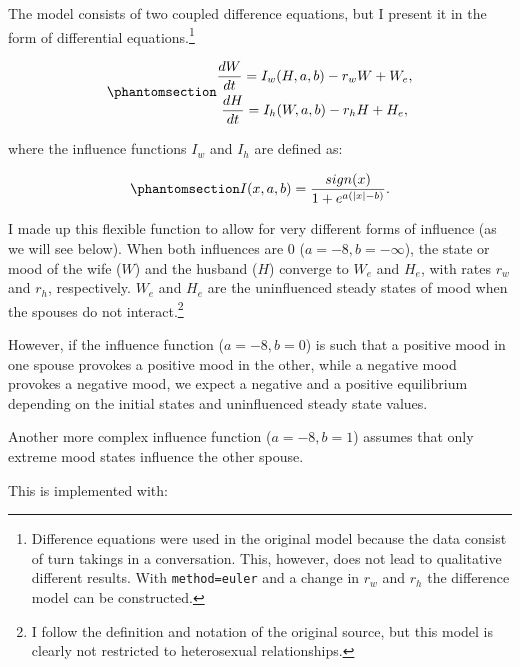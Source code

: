 \documentclass[
  a4paper,
  DIV=11,
  numbers=noendperiod,
  oneside]{scrreprt}
\begin{document}
The model consists of two coupled difference equations, but I present it
in the form of differential equations.\footnote{Difference equations
  were used in the original model because the data consist of turn
  takings in a conversation. This, however, does not lead to qualitative
  different results. With
  \texttt{method=\textquotesingle{}euler\textquotesingle{}} and a change
  in \(r_{w}\) and \(r_{h}\) the difference model can be constructed.}

\begin{equation}\phantomsection\label{eq-ch4n-11-old-31}{
\begin{gathered}
\frac{dW}{dt} = I_{w}(H,a,b) - r_{w}W + W_{e}, \\
\frac{dH}{dt} = I_{h}(W,a,b) - r_{h}H + H_{e},
\end{gathered}
}\end{equation}

where the influence functions \(I_{w}\) and \(I_{h}\) are defined as:

\begin{equation}\phantomsection\label{eq-ch4n-12-old-32}{
I(x,a,b) = \frac{sign(x)}{1 + e^{a\left( |x| - b \right)}}.
}\end{equation}

I made up this flexible function to allow for very different forms of
influence (as we will see below). When both influences are 0
(\(a = - 8,b = - \infty\)), the state or mood of the wife (\(W\)) and
the husband (\(H\)) converge to \(W_{e}\) and \(H_{e}\), with rates
\(r_{w}\) and \(r_{h}\), respectively. \(W_{e}\) and \(H_{e}\) are the
uninfluenced steady states of mood when the spouses do not
interact.\footnote{I follow the definition and notation of the original
  source, but this model is clearly not restricted to heterosexual
  relationships.}

However, if the influence function (\(a = - 8, b = 0\)) is such that a
positive mood in one spouse provokes a positive mood in the other, while
a negative mood provokes a negative mood, we expect a negative and a
positive equilibrium depending on the initial states and uninfluenced
steady state values.

Another more complex influence function (\(a = - 8, b = 1\)) assumes
that only extreme mood states influence the other spouse.

This is implemented with:
\end{document}
